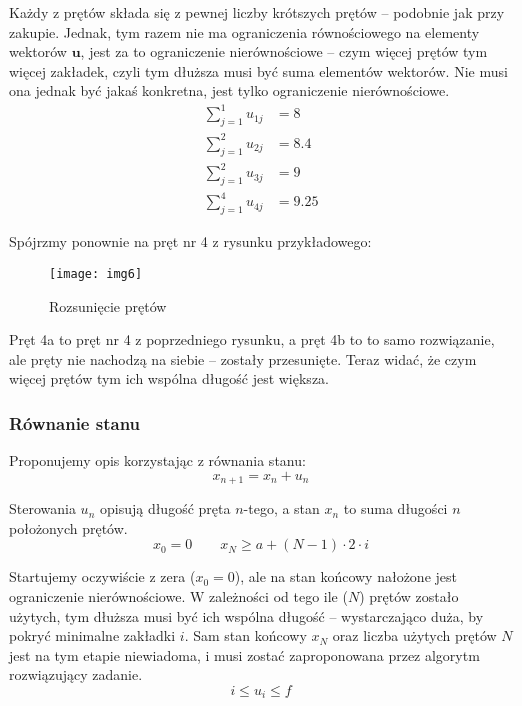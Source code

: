 \documentclass[11pt]{article}
\begin{document}
{Każdy z prętów składa się z pewnej liczby krótszych prętów -- podobnie jak przy zakupie. Jednak, tym razem nie ma ograniczenia równościowego na elementy wektorów $\mathbf{u}$, jest za to ograniczenie nierównościowe -- czym więcej prętów tym więcej zakładek, czyli tym dłuższa musi być suma elementów wektorów. Nie musi ona jednak być jakaś konkretna, jest tylko ograniczenie nierównościowe.
\begin{align*}
\sum_{j = 1}^{1} u_{1j} & = 8 \\
\sum_{j = 1}^{2} u_{2j} & = 8.4 \\
\sum_{j = 1}^{2} u_{3j} & = 9 \\
\sum_{j = 1}^{4} u_{4j} & = 9.25
\end{align*}

Spójrzmy ponownie na pręt nr 4 z rysunku przykładowego:
\begin{figure}[h!]
	\centering
	\texttt{[image: img6]}
	\caption{Rozsunięcie prętów}
\end{figure}

Pręt 4a to pręt nr 4 z poprzedniego rysunku, a pręt 4b to to samo rozwiązanie, ale pręty nie nachodzą na siebie -- zostały przesunięte. Teraz widać, że czym więcej prętów tym ich wspólna długość jest większa.

\subsubsection*{Równanie stanu}
Proponujemy opis korzystając z równania stanu:
\begin{equation*}
x_{n+1} = x_n + u_n
\end{equation*}

Sterowania $u_n$ opisują długość pręta $n$-tego, a stan $x_n$ to suma długości $n$ położonych prętów.
\begin{equation*}
x_0 = 0 \qquad x_N \ge a + (N - 1) \cdot 2 \cdot i
\end{equation*}

Startujemy oczywiście z zera ($x_0 = 0$), ale na stan końcowy nałożone jest ograniczenie nierównościowe. W zależności od tego ile ($N$) prętów zostało użytych, tym dłuższa musi być ich wspólna długość -- wystarczająco duża, by pokryć minimalne zakładki $i$. Sam stan końcowy $x_N$ oraz liczba użytych prętów $N$ jest na tym etapie niewiadoma, i musi zostać zaproponowana przez algorytm rozwiązujący zadanie.
\begin{equation*}
i \le u_i \le f
\end{equation*}

}
\end{document}

